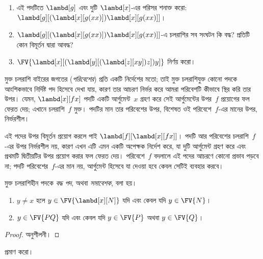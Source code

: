 \documentclass[../../../include/open-logic-section]{subfiles}
\begin{document}
\begin{prob}
  \begin{enumerate}
  \item এই পদটিতে $\lambd[g]$ এবং দুটি $\lambd[x]$-এর পরিসর শনাক্ত করো:
    $\lambd[g][(\lambd[x][g (x x)]) \lambd[x][g (x x)]]$।
  \item $\lambd[g][(\lambd[x][g (x x)]) \lambd[x][g (x x)]]$-এ
    চলরাশির সব সংঘটন কি বদ্ধ? প্রতিটি কোন বিমূর্তন দ্বারা আবদ্ধ?
    \item $\FV{\lambd[x][(\lambd[y][(\lambd[z][x y]) z]) y]}$ নির্ণয় করো।
  \end{enumerate}
\end{prob}

\begin{explain}
মুক্ত চলরাশি বাইরের জগতের (\emph{পরিবেশের}) প্রতি একটি নির্দেশের মতো;
তাই মুক্ত চলরাশিযুক্ত কোনো পদকে আংশিকভাবে নির্দিষ্ট পদ হিসেবে দেখা যায়,
কারণ তার আচরণ নির্ভর করে আমরা পরিবেশটি কীভাবে স্থির করি তার উপর। যেমন,
$\lambd[x][f x]$ পদটি একটি আর্গুমেন্ট~$x$ গ্রহণ করে সেই আর্গুমেন্টের
উপর~$f$ প্রয়োগের ফল ফেরত দেয়; এখানে চলরাশি~$f$ মুক্ত। পদটির মান তার
পরিবেশের উপর, বিশেষত ওই পরিবেশে~$f$-এর মানের উপর, নির্ভরশীল।

এই পদের উপর বিমূর্তন প্রয়োগ করলে পাই $\lambd[f][\lambd[x][f
    x]]$। পদটি আর পরিবেশের চলরাশি~$f$-এর উপর নির্ভরশীল নয়, কারণ এখন এটি
এমন একটি অপেক্ষক নির্দেশ করে, যা দুটি আর্গুমেন্ট গ্রহণ করে এবং প্রথমটি
দ্বিতীয়টির উপর প্রয়োগ করার ফল ফেরত দেয়। পরিবেশে~$f$ বদলালে এই পদের
আচরণে কোনো প্রভাব পড়বে না; পদটি পরিবেশের~$f$-এর মান নয়, আর্গুমেন্ট
হিসেবে যা দেওয়া হবে কেবল সেটিই ব্যবহার করবে।
\end{explain}

\begin{defn}[বদ্ধ পদ, সমাবেশক]
  মুক্ত চলরাশিহীন পদকে \emph{বদ্ধ পদ}, অথবা \emph{সমাবেশক}, বলা হয়।
\end{defn}

\begin{lem}
  \begin{enumerate}
    \item {} $y \neq x$ হলে $y \in
      \FV{\lambd[x][N]}$ যদি এবং কেবল যদি $y \in \FV{N}$।
    \item {} $y \in \FV{PQ}$ যদি এবং কেবল যদি
      $y \in \FV{P}$ অথবা $y \in \FV{Q}$।
    \end{enumerate}
\end{lem}

\begin{proof}
  অনুশীলনী।
\end{proof}

\begin{prob}
   প্রমাণ করো।
\end{prob}
\end{document}
